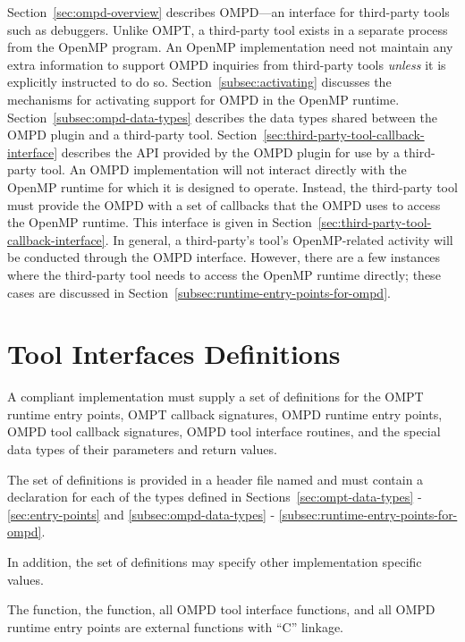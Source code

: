 Section~\ref{sec:ompd-overview} describes
OMPD---an interface for  third-party tools such as debuggers.
Unlike OMPT, a third-party tool exists in a separate process from
the OpenMP program.
An OpenMP implementation need not maintain any extra information to support OMPD inquiries from third-party tools
\emph{unless} it is explicitly instructed to do so.
Section~\ref{subsec:activating} discusses the mechanisms for
activating support for OMPD in the OpenMP runtime.
Section~\ref{subsec:ompd-data-types}  describes the data types shared between the OMPD plugin and a third-party tool.
Section~\ref{sec:third-party-tool-callback-interface} describes the API provided by the OMPD plugin for use by a third-party tool.
An OMPD implementation will not interact directly with the OpenMP
runtime for which it is designed to operate.
Instead, the third-party tool must provide the OMPD with a set of
callbacks that the OMPD uses to access the OpenMP runtime.
This interface is given in
Section~\ref{sec:third-party-tool-callback-interface}.
In general, a third-party's tool's OpenMP-related activity will be
conducted through the OMPD interface.
However, there are a few instances where the third-party tool needs
to access the OpenMP runtime directly;
these cases are discussed in
Section~\ref{subsec:runtime-entry-points-for-ompd}.

\section{Tool Interfaces Definitions}
\label{sec:tool_interfaces_definitions}

\begin{ccppspecific}

A compliant implementation must supply a set of definitions for the OMPT runtime entry 
points, OMPT callback signatures, OMPD runtime entry points, OMPD tool callback 
signatures, OMPD tool interface routines, and the special data types of their parameters 
and return values.

The set of definitions is provided in a header file named  and must 
contain a declaration for each of the types defined in 
Sections~\ref{sec:ompt-data-types} - \ref{sec:entry-points} and
\ref{subsec:ompd-data-types} - \ref{subsec:runtime-entry-points-for-ompd}. 

In addition, the set of definitions may specify other implementation specific values.

The  function, the  function, all OMPD 
tool interface functions, and all OMPD runtime entry points are external functions with 
``C'' linkage.
	
			
\end{ccppspecific}










